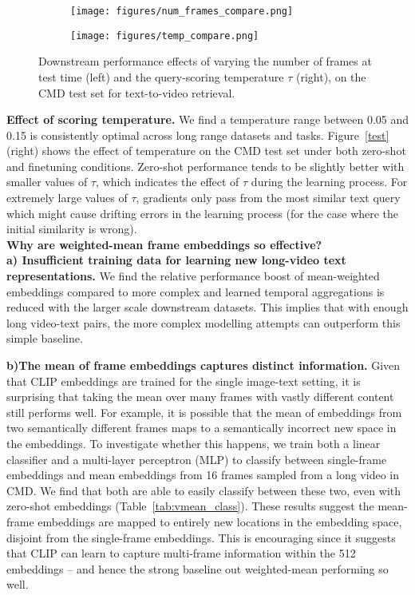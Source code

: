 \begin{figure}[t]
\centering
\begin{subfigure}{.5\textwidth}
    \centering
    \texttt{[image: figures/num\_frames\_compare.png]}
    \label{fig:cmd_num_frames}
\end{subfigure}\begin{subfigure}{.5\textwidth}
    \centering
    \texttt{[image: figures/temp\_compare.png]}
    \label{fig:cmd_temp_ablation}
\end{subfigure}
\caption{Downstream performance effects of varying the number of frames at test time (left) and the query-scoring temperature $\tau$ (right), on the CMD test set for text-to-video retrieval.}
\label{fig:test}
\end{figure}

\noindent\textbf{Effect of scoring temperature.}
We find a temperature range between 0.05 and 0.15 is consistently optimal across long range datasets and tasks. Figure~\ref{test} (right) shows the effect of temperature on the CMD test set under both zero-shot and finetuning conditions. Zero-shot performance tends to be slightly better with smaller values of $\tau$, which indicates the effect of $\tau$ during the learning process. For extremely large values of $\tau$, gradients only pass from the most similar text query which might cause drifting errors in the learning process (for the case where the initial similarity is wrong). \\

\noindent\textbf{Why are weighted-mean frame embeddings so effective?} \\

\noindent\textbf{a) Insufficient training data for learning new long-video text representations.} We find the relative performance boost of mean-weighted embeddings compared to more complex and learned temporal aggregations is reduced with the larger scale downstream datasets. This implies that with enough long video-text pairs, the more complex modelling attempts can outperform this simple baseline.

\noindent\textbf{b)The mean of frame embeddings captures distinct information.}
Given that CLIP embeddings are trained for the single image-text setting, it is surprising that taking the mean over many frames with vastly different content still performs well. For example, it is possible that the mean of embeddings from two semantically different frames maps to a semantically incorrect new space in the embeddings. To investigate whether this happens, we train both a linear classifier and a multi-layer perceptron (MLP) to classify between single-frame embeddings and mean embeddings from 16 frames sampled from a long video in CMD. We find that both are able to easily classify between these two, even with zero-shot embeddings (Table~\ref{tab:vmean_class}). These results suggest the mean-frame embeddings are mapped to entirely new locations in the embedding space, disjoint from the single-frame embeddings. This is encouraging since it suggests that CLIP can learn to capture multi-frame information within the 512 embeddings -- and hence the strong baseline out weighted-mean performing so well.


